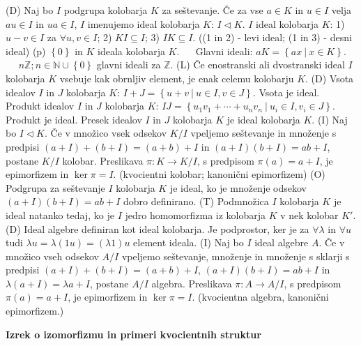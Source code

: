 \documentclass[10pt]{extarticle}
\begin{document}
        
             (D) Naj bo $I$ podgrupa kolobarja $K$ za seštevanje. Če za vse $a \in K$ in $u\in I$ velja $au\in I$ in $ua\in I$, $I$ imenujemo ideal kolobarja $K$: $I\triangleleft K$. 
             $I$ ideal kolobarja $K$: 1) $u-v\in I$ za $\forall u,v\in I$; 2) $KI\subseteq I$; 3) $IK\subseteq I$. ((1 in 2) - levi ideal; (1 in 3) - desni ideal)
             (p) $\left\{0\right\}$ in $K$ ideala kolobarja $K$. ~~ Glavni ideali: $aK=\left\{ax~|~x\in K\right\}$. ~~ $n\mathbb{Z}; n\in\mathbb{N}\cup\left\{0\right\}$ glavni ideali za $\mathbb{Z}$.
             (L) Če enostranski ali dvostranski ideal $I$ kolobarja $K$ vsebuje kak obrnljiv element, je enak celemu kolobarju $K$.
             (D) Vsota idealov $I$ in $J$ kolobarja $K$: $I+J=\left\{u+v~|~u\in I, v\in J\right\}$. Vsota je ideal. Produkt idealov $I$ in $J$ kolobarja $K$: $IJ=\left\{u_1v_1+\cdots+u_nv_n~|~u_i\in I, v_i\in J\right\}$. Produkt je ideal. Presek idealov $I$ in $J$ kolobarja $K$ je ideal kolobarja $K$.
             (I) Naj bo $I\triangleleft K$. Če v množico vsek odsekov $K/I$ vpeljemo seštevanje in množenje s predpisi $(a+I)+(b+I)=(a+b)+I$ in $(a+I)(b+I)=ab+I$, postane $K/I$ kolobar. Preslikava $\pi: K\to K/I$, s predpisom $\pi(a)=a+I$, je epimorfizem in $\ker\pi =I$. (kvocientni kolobar; kanonični epimorfizem)
             (O) Podgrupa za seštevanje $I$ kolobarja $K$ je ideal, ko je množenje odsekov $(a+I)(b+I)=ab+I$ dobro definirano.
             (T) Podmnožica $I$ kolobarja $K$ je ideal natanko tedaj, ko je $I$ jedro homomorfizma iz kolobarja $K$ v nek kolobar $K'$.
             (D) Ideal algebre definiran kot ideal kolobarja. Je podprostor, ker je za $\forall \lambda$ in $\forall u$ tudi $\lambda u=\lambda(1u)=(\lambda 1)u$ element ideala.
             (I) Naj bo $I$ ideal algebre $A$. Če v množico vseh odsekov $A/I$ vpeljemo seštevanje, množenje in množenje s sklarji s predpisi $(a+I)+(b+I)=(a+b)+I$, $(a+I)(b+I)=ab+I$ in $\lambda(a+I)=\lambda a+I$, postane $A/I$ algebra. Preslikava $\pi:A\to A/I$, s predpisom $\pi(a)=a+I$, je epimorfizem in $\ker\pi=I$. (kvocientna algebra, kanonični epimorfizem.)

    \textbf{Izrek o izomorfizmu in primeri kvocientnih struktur}
\end{document}
